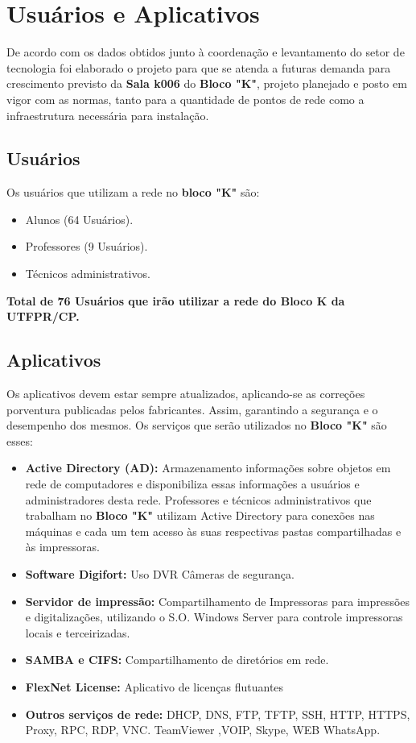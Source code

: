 \documentclass[	DIV=calc,%
							paper=a4,%
							fontsize=12pt,%
							onecolumn]{scrartcl}	 					%
\begin{document}
\section{Usuários e Aplicativos}
De acordo com os dados obtidos junto à coordenação e levantamento do setor de tecnologia foi elaborado o projeto para que se atenda a futuras demanda para crescimento previsto da \textbf{Sala k006} do \textbf{Bloco "K"}, projeto planejado e posto em vigor com as normas, tanto para a quantidade de pontos de rede como a infraestrutura necessária para instalação.
\subsection{Usuários}
Os usuários que utilizam a rede no \textbf{bloco "K"} são:
\begin{itemize}
\item Alunos (64 Usuários).
\item Professores (9 Usuários).
\item Técnicos administrativos.
\end{itemize}
\textbf{Total de 76 Usuários que irão utilizar a rede do Bloco K da UTFPR/CP.}

\subsection{Aplicativos}
Os aplicativos devem estar sempre atualizados, aplicando-se as correções porventura publicadas pelos fabricantes. Assim, garantindo a segurança e o desempenho dos mesmos.
Os serviços que serão utilizados no \textbf{Bloco "K"} são esses: 
\begin{itemize}
	\item \textbf{Active Directory (AD):} Armazenamento informações sobre objetos em rede de computadores e disponibiliza essas informações a usuários e administradores desta rede. Professores e  técnicos administrativos que trabalham no \textbf{Bloco "K"} utilizam Active Directory para conexões nas máquinas e cada um tem acesso às suas respectivas pastas compartilhadas e às impressoras.
	\item \textbf{Software Digifort:} Uso DVR Câmeras de segurança.
	\item \textbf{Servidor de impressão:} Compartilhamento de Impressoras para impressões e digitalizações, utilizando o S.O. Windows Server para controle impressoras locais e terceirizadas.
	\item \textbf{SAMBA e CIFS:} Compartilhamento de diretórios em rede.
	\item \textbf{FlexNet License:} Aplicativo de licenças flutuantes
	\item \textbf{Outros serviços de rede:} DHCP, DNS, FTP, TFTP, SSH, HTTP, HTTPS, Proxy, RPC, RDP, VNC. TeamViewer ,VOIP, Skype,  WEB WhatsApp.
\end{itemize}
\end{document}
